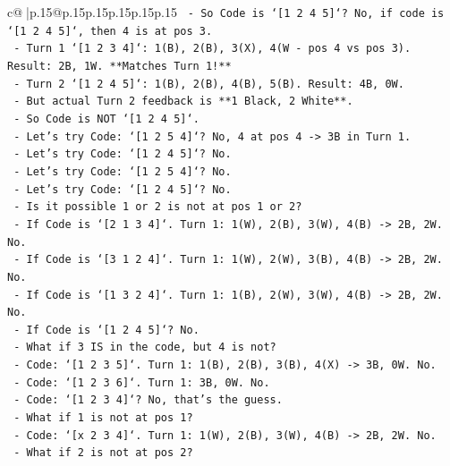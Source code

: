 \documentclass{article}
\begin{document}
{\begin{supertabular}{c@{$\;$}|p{.15\linewidth}@{}p{.15\linewidth}p{.15\linewidth}p{.15\linewidth}p{.15\linewidth}p{.15\linewidth}}
{{{\texttt{            {-} So Code is `{[}1 2 4 5{]}`? No, if code is `{[}1 2 4 5{]}`, then 4 is at pos 3.} \\
\texttt{                {-} Turn 1 `{[}1 2 3 4{]}`: 1(B), 2(B), 3(X), 4(W {-} pos 4 vs pos 3). Result: 2B, 1W. **Matches Turn 1!**} \\
\texttt{                {-} Turn 2 `{[}1 2 4 5{]}`: 1(B), 2(B), 4(B), 5(B). Result: 4B, 0W.} \\
\texttt{                {-} But actual Turn 2 feedback is **1 Black, 2 White**.} \\
\texttt{                {-} So Code is NOT `{[}1 2 4 5{]}`.} \\
\texttt{            {-} Let's try Code: `{[}1 2 5 4{]}`? No, 4 at pos 4 {-}> 3B in Turn 1.} \\
\texttt{            {-} Let's try Code: `{[}1 2 4 5{]}`? No.} \\
\texttt{            {-} Let's try Code: `{[}1 2 5 4{]}`? No.} \\
\texttt{            {-} Let's try Code: `{[}1 2 4 5{]}`? No.} \\
\texttt{            {-} Is it possible 1 or 2 is not at pos 1 or 2?} \\
\texttt{                {-} If Code is `{[}2 1 3 4{]}`. Turn 1: 1(W), 2(B), 3(W), 4(B) {-}> 2B, 2W. No.} \\
\texttt{                {-} If Code is `{[}3 1 2 4{]}`. Turn 1: 1(W), 2(W), 3(B), 4(B) {-}> 2B, 2W. No.} \\
\texttt{                {-} If Code is `{[}1 3 2 4{]}`. Turn 1: 1(B), 2(W), 3(W), 4(B) {-}> 2B, 2W. No.} \\
\texttt{                {-} If Code is `{[}1 2 4 5{]}`? No.} \\
\texttt{            {-} What if 3 IS in the code, but 4 is not?} \\
\texttt{                {-} Code: `{[}1 2 3 5{]}`. Turn 1: 1(B), 2(B), 3(B), 4(X) {-}> 3B, 0W. No.} \\
\texttt{                {-} Code: `{[}1 2 3 6{]}`. Turn 1: 3B, 0W. No.} \\
\texttt{                {-} Code: `{[}1 2 3 4{]}`? No, that's the guess.} \\
\texttt{            {-} What if 1 is not at pos 1?} \\
\texttt{                {-} Code: `{[}x 2 3 4{]}`. Turn 1: 1(W), 2(B), 3(W), 4(B) {-}> 2B, 2W. No.} \\
\texttt{            {-} What if 2 is not at pos 2?} \\
}}}
\end{supertabular}}
\end{document}
